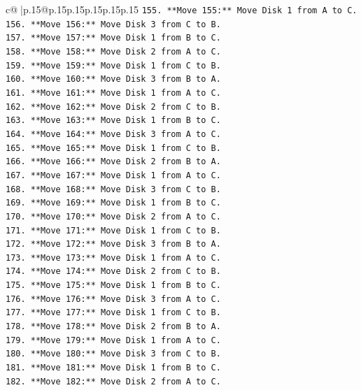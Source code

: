 \documentclass{article}
\begin{document}
{\begin{supertabular}{c@{$\;$}|p{.15\linewidth}@{}p{.15\linewidth}p{.15\linewidth}p{.15\linewidth}p{.15\linewidth}p{.15\linewidth}}
{{{\texttt{155. **Move 155:** Move Disk 1 from A to C.} \\
\texttt{156. **Move 156:** Move Disk 3 from C to B.} \\
\texttt{157. **Move 157:** Move Disk 1 from B to C.} \\
\texttt{158. **Move 158:** Move Disk 2 from A to C.} \\
\texttt{159. **Move 159:** Move Disk 1 from C to B.} \\
\texttt{160. **Move 160:** Move Disk 3 from B to A.} \\
\texttt{161. **Move 161:** Move Disk 1 from A to C.} \\
\texttt{162. **Move 162:** Move Disk 2 from C to B.} \\
\texttt{163. **Move 163:** Move Disk 1 from B to C.} \\
\texttt{164. **Move 164:** Move Disk 3 from A to C.} \\
\texttt{165. **Move 165:** Move Disk 1 from C to B.} \\
\texttt{166. **Move 166:** Move Disk 2 from B to A.} \\
\texttt{167. **Move 167:** Move Disk 1 from A to C.} \\
\texttt{168. **Move 168:** Move Disk 3 from C to B.} \\
\texttt{169. **Move 169:** Move Disk 1 from B to C.} \\
\texttt{170. **Move 170:** Move Disk 2 from A to C.} \\
\texttt{171. **Move 171:** Move Disk 1 from C to B.} \\
\texttt{172. **Move 172:** Move Disk 3 from B to A.} \\
\texttt{173. **Move 173:** Move Disk 1 from A to C.} \\
\texttt{174. **Move 174:** Move Disk 2 from C to B.} \\
\texttt{175. **Move 175:** Move Disk 1 from B to C.} \\
\texttt{176. **Move 176:** Move Disk 3 from A to C.} \\
\texttt{177. **Move 177:** Move Disk 1 from C to B.} \\
\texttt{178. **Move 178:** Move Disk 2 from B to A.} \\
\texttt{179. **Move 179:** Move Disk 1 from A to C.} \\
\texttt{180. **Move 180:** Move Disk 3 from C to B.} \\
\texttt{181. **Move 181:** Move Disk 1 from B to C.} \\
\texttt{182. **Move 182:** Move Disk 2 from A to C.} \\
}}}
\end{supertabular}}
\end{document}
